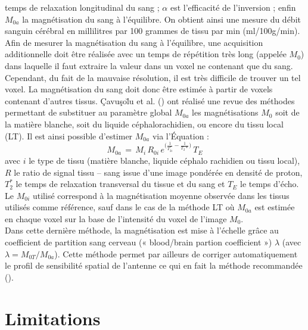 temps de relaxation longitudinal du sang ; $\alpha$ est l’efficacité de l’inversion ; enfin $M_{0a}$ la magnétisation
du sang à l’équilibre. On obtient ainsi une mesure du débit sanguin cérébral en millilitres par 100
grammes de tissu par min (ml/100g/min).\\
Afin de mesurer la magnétisation du sang à l’équilibre, une acquisition additionnelle doit être
réalisée avec un temps de répétition très long (appelée $M_0$) dans laquelle il faut extraire la valeur dans
un voxel ne contenant que du sang. Cependant, du fait de la mauvaise résolution, il est très difficile de
trouver un tel voxel. La magnétisation du sang doit donc être estimée à partir de voxels contenant
d’autres tissus. Çavuşo\u{l}u et al. (\cite{Cavusoglu2009}) ont réalisé une revue des méthodes permettant de substituer au
paramètre global $M_{0a}$
les magnétisations $M_0$ soit de la matière blanche, soit du liquide
céphalorachidien, ou encore du tissu local (LT). Il est ainsi possible d’estimer $M_{0a}$ via l’Équation :
\begin{equation}
M_{0a}\,=\,M_i\,R_{0i}\,e^{\bigl(\frac{1}{T_{2i}^{\ast}}-\frac{1}{T_2\ast}\bigr)}\,T_E
\end{equation}
avec $i$ le type de tissu (matière blanche, liquide céphalo rachidien ou tissu local), $R$ le ratio de signal
tissu – sang issue d’une image pondérée en densité de proton, $T_2^{\ast}$ le temps de relaxation transversal
du tissue et du sang et $T_E$ le temps d’écho. Le $M_{0i}$ utilisé correspond à la magnétisation moyenne
observée dans les tissus utilisés comme référence, sauf dans le cas de la méthode LT où $M_{0a}$ est
estimée en chaque voxel sur la base de l’intensité du voxel de l’image $M_0$.\\
Dans cette dernière méthode, la magnétisation est mise à l’échelle grâce au coefficient de
partition sang cerveau (« blood/brain partion coefficient ») $\lambda$ (avec $\lambda = M_{0T}/M_{0a}$). Cette méthode
permet par ailleurs de corriger automatiquement le profil de sensibilité spatial de l’antenne ce qui en
fait la méthode recommandée (\cite{Cavusoglu2009}).
\section{Limitations}
